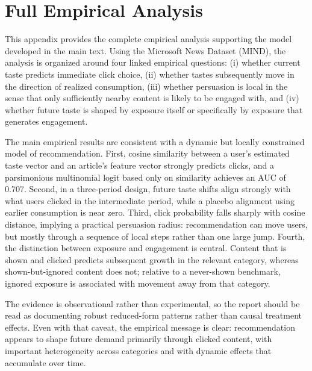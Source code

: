 \documentclass[11pt]{article}
\begin{document}
\appendix

\section{Full Empirical Analysis}\label{sec:appendix_empirical}

This appendix provides the complete empirical analysis supporting the model developed in the main text. Using the Microsoft News Dataset (MIND), the analysis is organized around four linked empirical questions: (i) whether current taste predicts immediate click choice, (ii) whether tastes subsequently move in the direction of realized consumption, (iii) whether persuasion is local in the sense that only sufficiently nearby content is likely to be engaged with, and (iv) whether future taste is shaped by exposure itself or specifically by exposure that generates engagement.

The main empirical results are consistent with a dynamic but locally constrained model of recommendation. First, cosine similarity between a user's estimated taste vector and an article's feature vector strongly predicts clicks, and a parsimonious multinomial logit based only on similarity achieves an AUC of 0.707. Second, in a three-period design, future taste shifts align strongly with what users clicked in the intermediate period, while a placebo alignment using earlier consumption is near zero. Third, click probability falls sharply with cosine distance, implying a practical persuasion radius: recommendation can move users, but mostly through a sequence of local steps rather than one large jump. Fourth, the distinction between exposure and engagement is central. Content that is shown and clicked predicts subsequent growth in the relevant category, whereas shown-but-ignored content does not; relative to a never-shown benchmark, ignored exposure is associated with movement away from that category.

The evidence is observational rather than experimental, so the report should be read as documenting robust reduced-form patterns rather than causal treatment effects. Even with that caveat, the empirical message is clear: recommendation appears to shape future demand primarily through clicked content, with important heterogeneity across categories and with dynamic effects that accumulate over time.

\end{document}
